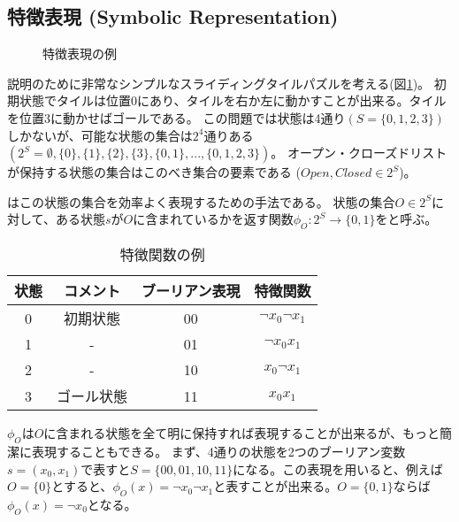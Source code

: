 \subsection{特徴表現 (Symbolic Representation)}
\label{sec:symbolic-representation}



\begin{figure}
  \centering
  \begin{tikzpicture}[scale=0.6]
    
  \end{tikzpicture}
\caption{特徴表現の例}
\label{fig:sliding-token}
\end{figure}


説明のために非常なシンプルなスライディングタイルパズルを考える(図\ref{fig:sliding-token})。
初期状態でタイルは位置0にあり、タイルを右か左に動かすことが出来る。タイルを位置3に動かせばゴールである。
この問題では状態は4通り$(S = \{0,1,2,3\})$しかないが、可能な状態の集合は$2^4$通りある $(2^S = \emptyset, \{0\}, \{1\}, \{2\}, \{3\}, \{0, 1\}, ..., \{0, 1, 2, 3\})$。
オープン・クローズドリストが保持する状態の集合はこのべき集合の要素である ($Open, Closed \in 2^S$)。

はこの状態の集合を効率よく表現するための手法である。
状態の集合$O \in 2^S$に対して、ある状態$s$が$O$に含まれているかを返す関数$\phi_{O}: 2^S \rightarrow \{0, 1\}$をと呼ぶ。

\begin{table}
\centering
\caption{特徴関数の例}
\label{tbl:sliding-token}
\begin{tabular}{c|c|c|c}
	状態 & コメント & ブーリアン表現 & 特徴関数 \\ \hline
	0		& 初期状態	& 00				& $\lnot x_0 \lnot x_1$ \\	
	1		& -			& 01				& $\lnot x_0  x_1$ \\	
	2		& -			& 10				& $x_0 \lnot x_1$ \\	
	3		& ゴール状態	& 11				& $x_0 x_1$ \\	
\end{tabular}
\end{table}

$\phi_O$は$O$に含まれる状態を全て明に保持すれば表現することが出来るが、もっと簡潔に表現することもできる。
まず、4通りの状態を2つのブーリアン変数 $s = (x_0, x_1)$で表すと$S = \{00, 01, 10, 11\}$になる。この表現を用いると、例えば$O = \{0\}$とすると、$\phi_{O}(x) = \lnot x_0 \lnot x_1$と表すことが出来る。$O = \{0, 1\}$ならば$\phi_{O}(x) = \lnot x_0$となる。

